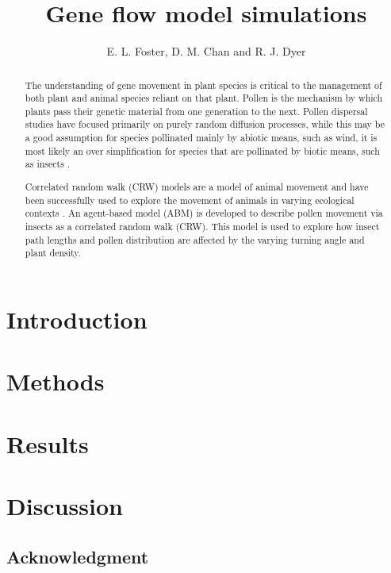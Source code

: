 \documentclass{article}
\title{Gene flow model simulations}
\author{E. L. Foster, D. M. Chan and R. J. Dyer }
\begin{document}
\maketitle

\begin{abstract} 
  The understanding of gene movement in plant species is critical to the management
  of both plant and animal species reliant on that plant.  Pollen is the mechanism by which plants
  pass their genetic material from one generation to the next. Pollen dispersal studies have focused
  primarily on purely random diffusion processes, while this may be a good assumption for species
  pollinated mainly by abiotic means, such as wind, it is most likely an over simplification for
  species that are pollinated by biotic means, such as insects \cite{Chan}.

  Correlated random walk (CRW) models are a model of animal movement \cite{Prasad05} and have been
  successfully used to explore the movement of animals in varying ecological contexts
  \cite{Bartumeus07}. An agent-based model (ABM) is developed to describe pollen movement via insects
  as a correlated random walk (CRW). This model is used to explore how insect path lengths and pollen
  distribution are affected by the varying turning angle and plant density.  
\end{abstract}

\section{Introduction}
  
\section{Methods}
  
\section{Results}
  
\section{Discussion}
  
\subsection*{Acknowledgment}



\end{document}
